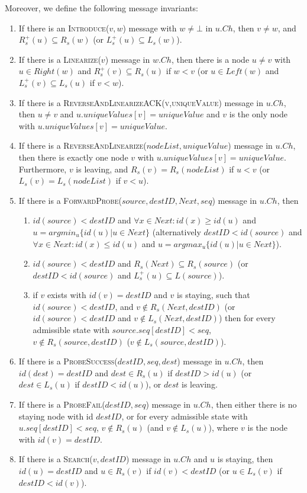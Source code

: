 \documentclass[a4paper,USenglish]{lipics}
\newcommand{\linearize}[1]{\textsc{Linearize(\ensuremath{#1})}\xspace}
\newcommand{\introduce}[1]{\textsc{Introduce(\ensuremath{#1})}\xspace}
\newcommand{\search}[1]{\textsc{Search(\ensuremath{#1})}\xspace}
\newcommand{\forwardprobe}[1]{\textsc{ForwardProbe(\ensuremath{#1})}\xspace}
\newcommand{\psuccess}[1]{\textsc{ProbeSuccess(\ensuremath{#1})}\xspace}
\newcommand{\pfail}[1]{\textsc{ProbeFail(\ensuremath{#1})}\xspace}
\newcommand{\rsp}{\ensuremath{R_s^+}\xspace}
\newcommand{\lsp}{\ensuremath{L_s^+}\xspace}
\newcommand{\revandlin}[1]{\textsc{ReverseAndLinearize(\ensuremath{#1})}\xspace} \newcommand{\revandlinREQ}[1]{\textsc{ReverseAndLinearizeREQ(#1)}\xspace}
\newcommand{\revandlinACK}[1]{\textsc{ReverseAndLinearizeACK(#1)}\xspace}
\begin{document}
Moreover, we define the following message invariants:
\begin{enumerate}
    \item If there is an \introduce{v,w} message with $w \neq \bot$ in $u.Ch$, then $v \neq w$, and $\rsp(u) \subseteq R_s(w)$ (or $\lsp(u) \subseteq L_s(w)$).
    \item If there is a \linearize{v} message in $w.Ch$, then there is a node $u \neq v$ with $u \in Right(w)$ and $\rsp(v) \subseteq R_s(u)$ if $w < v$ (or $u \in Left(w)$ and $\lsp(v) \subseteq L_s(u)$ if $v < w$).
    \item If there is a \revandlinACK{v,uniqueValue} message in $u.Ch$, then $u \neq v$ and $u.uniqueValues[v] = uniqueValue$ and $v$ is the only node with $u.uniqueValues[v] = uniqueValue$.
    \item If there is a \revandlin{nodeList,uniqueValue} message in $u.Ch$, then there is exactly one node $v$ with $u.uniqueValues[v] = uniqueValue$.
    Furthermore, $v$ is leaving, and $R_s(v) = R_s(nodeList)$ if $u < v$ (or $L_s(v) = L_s(nodeList)$ if $v < u$).
    \item If there is a \forwardprobe{source,destID,Next,seq} message in $u.Ch$, then
    \begin{enumerate}
	\item $id(source) < destID$ and $\forall x \in Next: id(x) \geq id(u)$ and $u = argmin_u\{id(u) | u \in Next\}$ 
	(alternatively $destID < id(source)$ and $\forall x \in Next: id(x) \leq id(u)$ and $u = argmax_u\{id(u) | u \in Next\}$).
	\item $id(source) < destID$ and $R_s(Next) \subseteq R_s(source)$ (or $destID < id(source)$ and $\lsp(u) \subseteq L(source)$).
	\item if $v$ exists with $id(v) = destID$ and $v$ is staying, such that $id(source) < destID$, and $v \notin R_s(Next,destID)$ (or $id(source) < destID$ and $v \notin L_s(Next,destID)$) then for every admissible state with $source.seq[destID] < seq$, $v \notin R_s(source,destID)$ ($v \notin L_s(source,destID)$).
    \end{enumerate}
    \item If there is a \psuccess{destID, seq, dest} message in $u.Ch$, then $id(dest) = destID$ and $dest \in R_s(u)$ if $destID > id(u)$ (or $dest \in L_s(u)$ if $destID < id(u)$), or $dest$ is leaving.
    \item If there is a \pfail{destID, seq} message in $u.Ch$, then either there is no staying node with id $destID$, or for every admissible state with $u.seq[destID] < seq$, $v \notin R_s(u)$ (and $v \notin L_s(u)$), where $v$ is the node with $id(v)= destID$.
    \item If there is a \search{v, destID} message in $u.Ch$ and $u$ is staying, then $id(u) = destID$ and $u \in R_s(v)$ if $id(v) < destID$ (or $u \in L_s(v)$ if $destID < id(v)$).
\end{enumerate}
\end{document}
